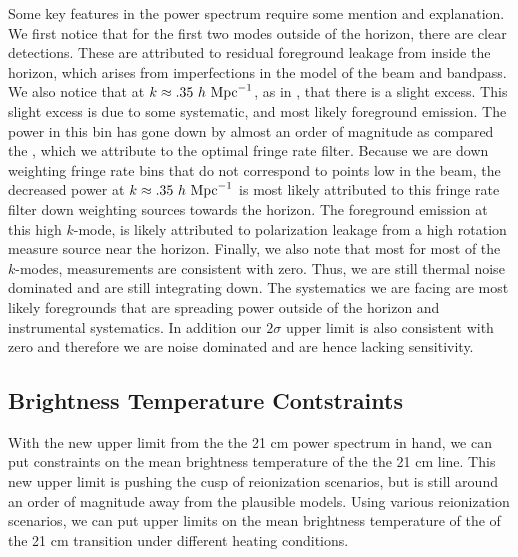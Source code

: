 \documentclass[twocolumn,numberedappendix]{emulateapj} \shorttitle{PSA64}
\begin{document}
Some key features in the power spectrum require some mention and explanation. We
first notice that for the first two modes outside of the horizon, there are
clear detections. These are attributed to residual foreground leakage from
inside the horizon, which arises from imperfections in the model of the beam and
bandpass. We also notice that at $k\approx{.35}\ h\ {\rm Mpc}^{-1}$, as in
\cite{parsons_et_al2014}, that there is a slight excess. This slight excess is
due to some systematic, and most likely foreground emission. The power in this
bin has gone down by almost an order of magnitude as compared the
\cite{parsons_et_al2014}, which we attribute to the optimal fringe rate filter.
Because we are down weighting fringe rate bins that do not correspond to points
low in the beam, the decreased power at $k\approx{.35}\ h\ {\rm Mpc}^{-1}$ is
most likely attributed to this fringe rate filter down weighting sources towards
the horizon. The foreground emission at this high $k$-mode, is likely attributed
to polarization leakage from a high rotation measure source near the horizon.
Finally, we also note that most for most of the $k$-modes, measurements are
consistent with zero. Thus, we are still thermal noise dominated and are still
integrating down. The systematics we are facing are most likely foregrounds that
are spreading power outside of the horizon and instrumental systematics. In
addition our $2\sigma$ upper limit is also consistent with zero and therefore we
are noise dominated and are hence lacking sensitivity.

\subsection{Brightness Temperature Contstraints}
With the new upper limit from the the 21 cm power spectrum in hand, we can put
constraints on the mean brightness temperature of the the 21 cm line. This new
upper limit is pushing the cusp of reionization scenarios, but is still around
an order of magnitude away from the plausible models. Using
various reionization scenarios, we can put upper limits on the mean brightness
temperature of the of the 21 cm transition under different heating conditions.
\end{document}
